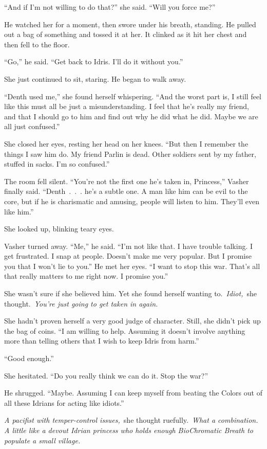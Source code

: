 “And if I’m not willing to do that?” she said. “Will you force me?”

He watched her for a moment, then swore under his breath, standing. He pulled out a bag of something and tossed it at her. It clinked as it hit her chest and then fell to the floor.

“Go,” he said. “Get back to Idris. I’ll do it without you.”

She just continued to sit, staring. He began to walk away.

“Denth used me,” she found herself whispering. “And the worst part is, I still feel like this must all be just a misunderstanding. I feel that he’s really my friend, and that I should go to him and find out why he did what he did. Maybe we are all just confused.”

She closed her eyes, resting her head on her knees. “But then I remember the things I saw him do. My friend Parlin is dead. Other soldiers sent by my father, stuffed in sacks. I’m so confused.”

The room fell silent. “You’re not the first one he’s taken in, Princess,” Vasher finally said. “Denth~.~.~. he’s a subtle one. A man like him can be evil to the core, but if he is charismatic and amusing, people will listen to him. They’ll even like him.”

She looked up, blinking teary eyes.

Vasher turned away. “Me,” he said. “I’m not like that. I have trouble talking. I get frustrated. I snap at people. Doesn’t make me very popular. But I promise you that I won’t lie to you.” He met her eyes. “I want to stop this war. That’s all that really matters to me right now. I promise you.”

She wasn’t sure if she believed him. Yet she found herself wanting to.~\textit{Idiot,}~she thought.~\textit{You’re just going to get taken in again.}

She hadn’t proven herself a very good judge of character. Still, she didn’t pick up the bag of coins. “I am willing to help. Assuming it doesn’t involve anything more than telling others that I wish to keep Idris from harm.”

“Good enough.”

She hesitated. “Do you really think we can do it. Stop the war?”

He shrugged. “Maybe. Assuming I can keep myself from beating the Colors out of all these Idrians for acting like idiots.”

\textit{A pacifist with temper-control issues,}~she thought ruefully.~\textit{What a combination. A little like a devout Idrian princess who holds enough BioChromatic Breath to populate a small village.}

